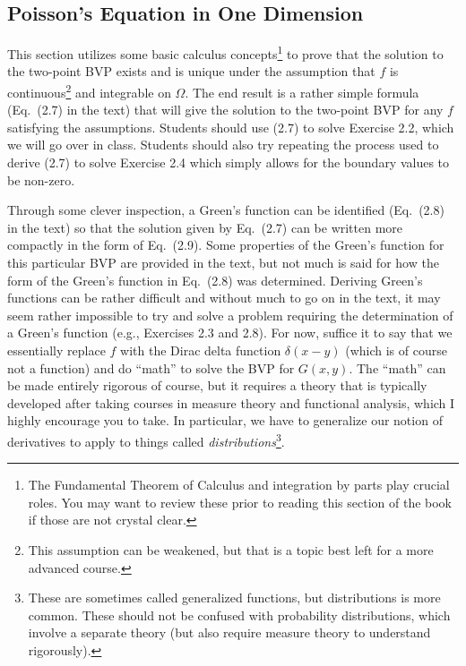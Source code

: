 \documentclass{amsart}
\theoremstyle{plain}
\theoremstyle{definition}
\theoremstyle{remark}
\theoremstyle{definition}
\numberwithin{equation}{section}
\numberwithin{equation}{section}
\begin{document}
\subsection{Poisson's Equation in One Dimension}

This section utilizes some basic calculus concepts\footnote{The Fundamental Theorem of Calculus and integration by parts play crucial roles. You may want to review these prior to reading this section of the book if those are not crystal clear.} to prove that the solution to the two-point BVP exists and is unique under the assumption that $f$ is continuous\footnote{This assumption can be weakened, but that is a topic best left for a more advanced course.} and integrable on $\Omega$.
The end result is a rather simple formula (Eq.~(2.7) in the text) that will give the solution to the two-point BVP for any $f$ satisfying the assumptions.
Students should use (2.7) to solve Exercise 2.2, which we will go over in class. 
Students should also try repeating the process used to derive (2.7) to solve Exercise 2.4 which simply allows for the boundary values to be non-zero. 

Through some clever inspection, a Green's function can be identified (Eq.~(2.8) in the text) so that the solution given by Eq.~(2.7) can be written more compactly in the form of Eq.~(2.9).   
Some properties of the Green's function for this particular BVP are provided in the text, but not much is said for how the form of the Green's function in Eq.~(2.8) was determined.
Deriving Green's functions can be rather difficult and without much to go on in the text, it may seem rather impossible to try and solve a problem requiring the determination of a Green's function (e.g., Exercises 2.3 and 2.8).
For now, suffice it to say that we essentially replace $f$ with the Dirac delta function $\delta(x-y)$ (which is of course not a function) and do ``math'' to solve the BVP for $G(x,y)$. 
The ``math'' can be made entirely rigorous of course, but it requires a theory that is typically developed after taking courses in measure theory and functional analysis, which I highly encourage you to take.
In particular, we have to generalize our notion of derivatives to apply to things called {\em distributions}\footnote{These are sometimes called generalized functions, but distributions is more common. These should not be confused with probability distributions, which involve a separate theory (but also require measure theory to understand rigorously).}. 
\end{document}
